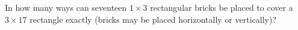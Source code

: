 In how many ways can seventeen $1\times3$ rectangular bricks be placed to cover a $3\times17$ rectangle exactly (bricks may be placed horizontally or vertically)?
